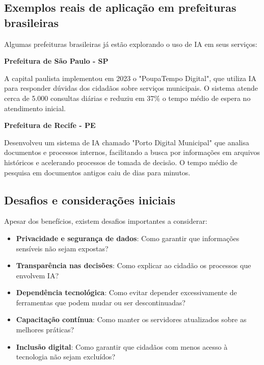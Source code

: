 \documentclass[12pt,a4paper]{book}
\begin{document}
\subsection{Exemplos reais de aplicação em prefeituras brasileiras}

Algumas prefeituras brasileiras já estão explorando o uso de IA em seus serviços:

\begin{tcolorbox}[estudo]
\textbf{Prefeitura de São Paulo - SP} 

A capital paulista implementou em 2023 o "PoupaTempo Digital", que utiliza IA para responder dúvidas dos cidadãos sobre serviços municipais. O sistema atende cerca de 5.000 consultas diárias e reduziu em 37\% o tempo médio de espera no atendimento inicial.
\end{tcolorbox}

\begin{tcolorbox}[estudo]
\textbf{Prefeitura de Recife - PE}

Desenvolveu um sistema de IA chamado "Porto Digital Municipal" que analisa documentos e processos internos, facilitando a busca por informações em arquivos históricos e acelerando processos de tomada de decisão. O tempo médio de pesquisa em documentos antigos caiu de dias para minutos.
\end{tcolorbox}

\subsection{Desafios e considerações iniciais}

Apesar dos benefícios, existem desafios importantes a considerar:

\begin{itemize}
    \item \textbf{Privacidade e segurança de dados}: Como garantir que informações sensíveis não sejam expostas?
    \item \textbf{Transparência nas decisões}: Como explicar ao cidadão os processos que envolvem IA?
    \item \textbf{Dependência tecnológica}: Como evitar depender excessivamente de ferramentas que podem mudar ou ser descontinuadas?
    \item \textbf{Capacitação contínua}: Como manter os servidores atualizados sobre as melhores práticas?
    \item \textbf{Inclusão digital}: Como garantir que cidadãos com menos acesso à tecnologia não sejam excluídos?
\end{itemize}
\end{document}
